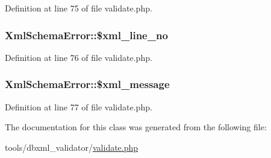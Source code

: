 Definition at line 75 of file validate.\+php.

\hypertarget{classXmlSchemaError_a2094eb442ad426768d6bc9413bf5c27a}{
\subsubsection[{\$xml\+\_\+line\+\_\+no}]{\setlength{\rightskip}{0pt plus 5cm}Xml\+Schema\+Error\+::\$xml\+\_\+line\+\_\+no}}\label{classXmlSchemaError_a2094eb442ad426768d6bc9413bf5c27a}


Definition at line 76 of file validate.\+php.

\hypertarget{classXmlSchemaError_acbea6440352e9b0fb6d3f7e37528f0de}{
\subsubsection[{\$xml\+\_\+message}]{\setlength{\rightskip}{0pt plus 5cm}Xml\+Schema\+Error\+::\$xml\+\_\+message}}\label{classXmlSchemaError_acbea6440352e9b0fb6d3f7e37528f0de}


Definition at line 77 of file validate.\+php.



The documentation for this class was generated from the following file\+:\begin{DoxyCompactItemize}
\item 
tools/dbxml\+\_\+validator/\hyperlink{validate_8php}{validate.\+php}\end{DoxyCompactItemize}
